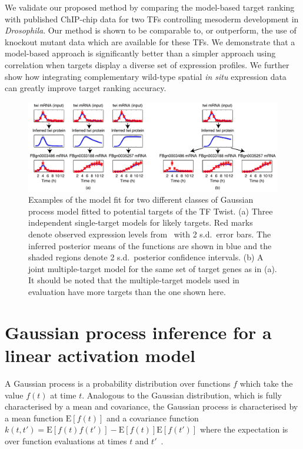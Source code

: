 \documentclass{pnastwo}
\begin{document}
\begin{article}
We validate our proposed method by comparing the model-based target
ranking with published ChIP-chip data for two TFs controlling
mesoderm development in \emph{Drosophila}. Our method is shown to be comparable
to, or outperform, the use of knockout mutant data which are available
for these TFs. We demonstrate that a model-based approach is significantly
better than a simpler approach using correlation when targets display a diverse set of expression profiles. We further show how integrating complementary wild-type spatial
{\em in situ} expression data can greatly improve target ranking accuracy. 

\begin{figure}[tb]
  \centering
  \includegraphics{fig1}
  \caption{Examples of the model fit for two different classes of 
    Gaussian process model fitted to potential targets of the TF Twist. (a) Three independent single-target models
    for likely targets. Red marks denote observed expression
    levels from~\cite{Tomancak2002} with 2 s.d.\ error bars.
    The inferred posterior means of the functions are shown in blue
    and the shaded regions denote 2 s.d.\ posterior confidence
    intervals. (b) A joint multiple-target model for
    the same set of target genes as in (a). It should be noted that
    the multiple-target models used in evaluation have more targets
    than the one shown here.\label{fig:gpdisim_models}
}
\end{figure}

\section{Gaussian process inference for a linear activation model}

A Gaussian process is a probability distribution over
functions $f$ which take the value $f(t)$ at time
$t$. Analogous to the Gaussian distribution, which is fully
characterised by a mean and covariance, the Gaussian process is
characterised by a mean function $\mathrm{E}[f(t)]$ and a covariance
function $k(t,t')=\mathrm{E}[f(t)f(t')]-\mathrm{E}[f(t)]\mathrm{E}[f(t')]$
where the expectation is over function evaluations at times $t$ and
$t'$~\cite{Rasmussen2006}.


\end{article}
\end{document}
